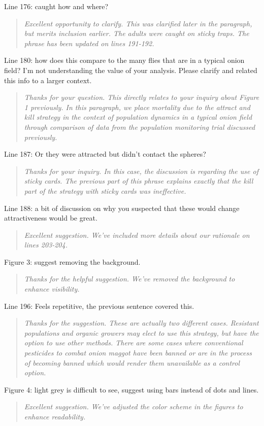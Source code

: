 \documentclass{article}
\begin{document}
Line 176: caught how and where?

\begin{quote}
    \textit{Excellent opportunity to clarify.  This was clarified later in the paragraph, but merits inclusion earlier.  The adults were caught on sticky traps.  The phrase has been updated on lines 191-192. 
    }
\end{quote}

Line 180: how does this compare to the many flies that are in a typical onion field? I'm not understanding the value of your analysis. Please clarify and related this info to a larger context.

\begin{quote}
    \textit{Thanks for your question.  This directly relates to your inquiry about Figure 1 previously.  In this paragraph, we place mortality due to the attract and kill strategy in the context of population dynamics in a typical onion field through comparison of data from the population monitoring trial discussed previously.  }
\end{quote}

Line 187: Or they were attracted but didn't contact the spheres?

\begin{quote}
    \textit{Thanks for your inquiry.  In this case, the discussion is regarding the use of sticky cards.  The previous part of this phrase explains exactly that the kill part of the strategy with sticky cards was ineffective.  }
\end{quote}

Line 188: a bit of discussion on why you suspected that these would change attractiveness would be great.

\begin{quote}
    \textit{Excellent suggestion.  We've included more details about our rationale on lines 203-204. 
    }
\end{quote}

Figure 3: suggest removing the background.  

\begin{quote}
    \textit{Thanks for the helpful suggestion.  We've removed the background to enhance visibility.  }
\end{quote}

Line 196: Feels repetitive, the previous sentence covered this.

\begin{quote}
    \textit{Thanks for the suggestion.  These are actually two different cases.  Resistant populations and organic growers may elect to use this strategy, but have the option to use other methods.  There are some cases where conventional pesticides to combat onion maggot have been banned or are in the process of becoming banned which would render them unavailable as a control option.  }
\end{quote}

Figure 4: light grey is difficult to see, suggest using bars instead of dots and lines.

\begin{quote}
    \textit{Excellent suggestion.  We've adjusted the color scheme in the figures to enhance readability.  }
\end{quote}
\end{document}

